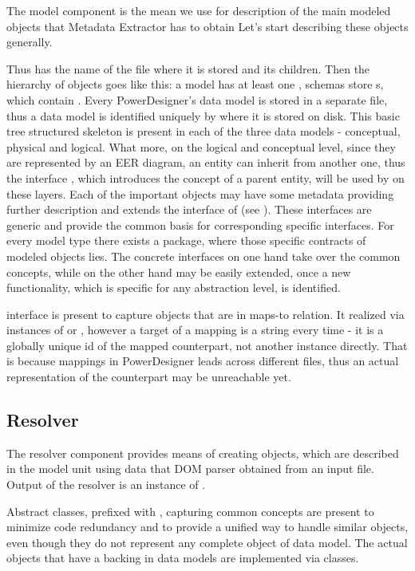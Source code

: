 The model component is the mean we use for description of the main modeled objects that Metadata Extractor has to obtain
Let's start describing these objects generally.

Thus  has the name of the file where it is stored and its children. 
Then the hierarchy of objects goes like this: a model has at least one , schemas store s, which contain .
Every PowerDesigner's data model is stored in a separate file, thus a data model is identified uniquely by where it is stored on disk.
This basic tree structured skeleton is present in each of the three data models - conceptual, physical and logical. 
What more, on the logical and conceptual level, since they are represented by an EER diagram, an entity can inherit from another one, thus the interface , which introduces the concept of a parent entity, will be used by on these layers. 
Each of the important objects may have some metadata providing further description and extends the interface of  (see ).
These interfaces are generic and provide the common basis for corresponding specific interfaces.
For every model type there exists a package, where those specific contracts of modeled objects lies. 
The concrete interfaces on one hand take over the common concepts, while on the other hand may be easily extended, once a new functionality, which is specific for any abstraction level, is identified.

 interface is present to capture objects that are in maps-to relation. It realized via instances of  or  , however a target of a mapping is a string every time - it is a globally unique id of the mapped counterpart, not another instance directly. That is because mappings in PowerDesigner leads across different files, thus an actual representation of the counterpart may be unreachable yet.

\subsection{Resolver}

The resolver component provides means of creating objects, which are described in the model unit using data that DOM parser obtained from an input file. Output of the resolver is an instance of .

Abstract classes, prefixed with , capturing common concepts are present to minimize code redundancy and to provide a unified way to handle similar objects, even though they do not represent any complete object of data model. 
The actual objects that have a backing in data models are implemented via  classes.

